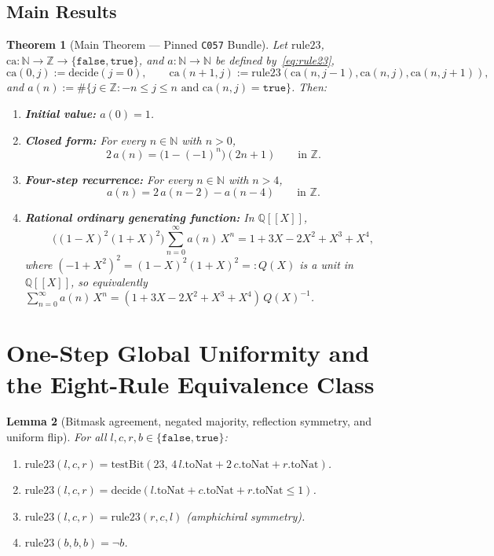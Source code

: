 \documentclass[11pt]{article}
\newcommand{\llbracket}{[\![}
\newcommand{\rrbracket}{]\!]}
\newtheorem{theorem}{Theorem}[section]
\newtheorem{lemma}[theorem]{Lemma}
\theoremstyle{definition}
\newcommand{\N}{\mathbb{N}}
\newcommand{\Z}{\mathbb{Z}}
\newcommand{\Q}{\mathbb{Q}}
\newcommand{\ca}{\mathrm{ca}}
\newcommand{\ruleTwoThree}{\mathrm{rule23}}
\newcommand{\btrue}{\mathtt{true}}
\newcommand{\bfalse}{\mathtt{false}}
\begin{document}
\subsection{Main Results}

\begin{theorem}[Main Theorem --- Pinned \texttt{C057} Bundle]
\label{thm:main}
Let $\ruleTwoThree$, $\ca : \N \to \Z \to \{\bfalse, \btrue\}$, and $a : \N \to \N$ be defined by~\eqref{eq:rule23},
\[
\ca(0, j) := \mathrm{decide}(j = 0), \qquad \ca(n + 1, j) := \ruleTwoThree(\ca(n, j - 1), \ca(n, j), \ca(n, j + 1)),
\]
and $a(n) := \#\{j \in \Z : -n \le j \le n \text{ and } \ca(n, j) = \btrue\}$. Then:
\begin{enumerate}
\item[\textup{(0)}] \textbf{Initial value:} $a(0) = 1$.
\item[\textup{(1)}] \textbf{Closed form:} For every $n \in \N$ with $n > 0$,
\[
2\,a(n) = \bigl(1 - (-1)^n\bigr)(2n + 1) \qquad \text{in } \Z.
\]
\item[\textup{(2)}] \textbf{Four-step recurrence:} For every $n \in \N$ with $n > 4$,
\[
a(n) = 2\,a(n - 2) - a(n - 4) \qquad \text{in } \Z.
\]
\item[\textup{(3)}] \textbf{Rational ordinary generating function:} In $\Q\llbracket X \rrbracket$,
\[
\bigl((1 - X)^2(1 + X)^2\bigr)\sum_{n=0}^{\infty} a(n)\,X^n = 1 + 3X - 2X^2 + X^3 + X^4,
\]
where $(-1 + X^2)^2 = (1 - X)^2(1 + X)^2 =: Q(X)$ is a unit in $\Q\llbracket X \rrbracket$, so equivalently $\sum_{n=0}^{\infty} a(n)\,X^n = (1 + 3X - 2X^2 + X^3 + X^4)\,Q(X)^{-1}$.
\end{enumerate}
\end{theorem}

\section{One-Step Global Uniformity and the Eight-Rule Equivalence Class}

\begin{lemma}[Bitmask agreement, negated majority, reflection symmetry, and uniform flip]
\label{lem:rule23}
For all $l, c, r, b \in \{\bfalse, \btrue\}$:
\begin{enumerate}
\item[\textup{(a)}] $\ruleTwoThree(l, c, r) = \mathrm{testBit}(23,\, 4\,l.\mathrm{toNat} + 2\,c.\mathrm{toNat} + r.\mathrm{toNat})$.
\item[\textup{(b)}] $\ruleTwoThree(l, c, r) = \mathrm{decide}(l.\mathrm{toNat} + c.\mathrm{toNat} + r.\mathrm{toNat} \le 1)$.
\item[\textup{(c)}] $\ruleTwoThree(l, c, r) = \ruleTwoThree(r, c, l)$ (amphichiral symmetry).
\item[\textup{(d)}] $\ruleTwoThree(b, b, b) = \neg b$.
\end{enumerate}
\end{lemma}
\end{document}
